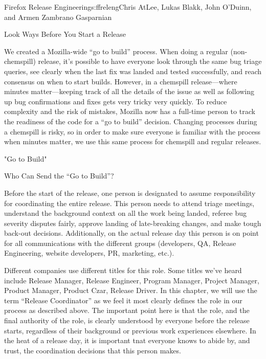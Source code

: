 \begin{aosachapter}{Firefox Release Engineering}{s:ffreleng}{Chris AtLee, Lukas Blakk, John O'Duinn, and Armen Zambrano Gasparnian}
\begin{aosasect1}{Look  Ways Before You Start a Release}
\begin{aosaenumerate}
\item We created a Mozilla-wide ``go to build'' process. When doing a
  regular (non-chemspill) release, it's possible to have everyone look
  through the same bug triage queries, see clearly when
  the last fix was landed and tested successfully, and reach consensus on
  when to start builds. However, in a chemspill release---where
  minutes matter---keeping track of all the details of the issue as well as
  following up bug confirmations and fixes gets very tricky very
  quickly.  To reduce complexity and the risk of mistakes, Mozilla
  now has a full-time person 
  to track the readiness of the code for a ``go to build''
  decision. Changing processes
  during a chemspill is risky, so in order to make sure everyone
  is familiar with the process when minutes matter, we use this
  same process for chemspill and regular releases.

\end{aosaenumerate}


\end{aosasect1}

\begin{aosasect1}{"Go to Build"}

\begin{aosasect2}{Who Can Send the ``Go to Build''?}

Before the start of the release, one person is designated to assume
responsibility for coordinating the entire release. This person needs to 
attend triage meetings, understand the
background context on all the work being landed, referee bug severity
disputes fairly, approve landing of late-breaking changes, and make
tough back-out decisions.  Additionally, on the actual release day
this person is on point for all communications with the different
groups (developers, QA, Release Engineering, website developers, PR,
marketing, etc.).

Different companies use different titles for this role. Some titles we've heard 
include Release Manager, Release Engineer, Program Manager, Project 
Manager, Product Manager, Product Czar, Release
Driver. In this chapter, we will use the term ``Release Coordinator''
as we feel it most clearly defines the role in our process as described above. 
The important point here is that the role, and the final authority of the role, is
clearly understood by everyone before the release starts, regardless 
of their background or previous work experiences elsewhere. In the 
heat of a release day, it is important tnat everyone knows to abide by, and trust, 
the coordination decisions that this person makes. 


\end{aosasect2}
\end{aosasect1}
\end{aosachapter}
